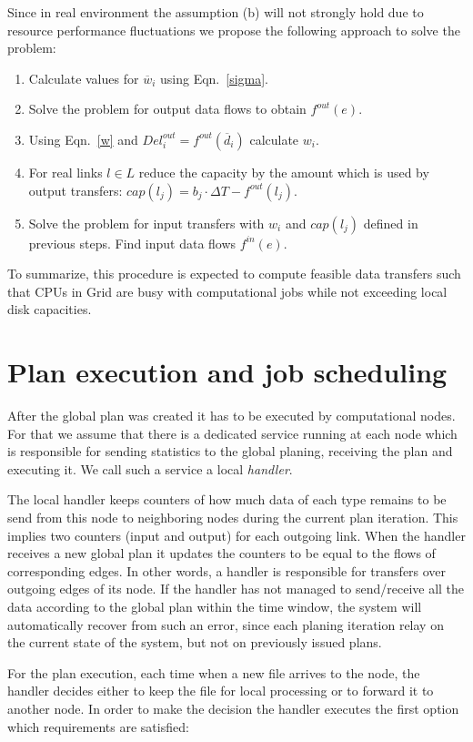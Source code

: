 \documentclass{svjour3}                     %
\begin{document}
Since in real environment the assumption (b) will not strongly hold due to
resource performance fluctuations we propose the following approach to
solve the problem:
%
\begin{enumerate}
\item Calculate values for $\overline{w}_{i}$ using Eqn.~\ref{sigma}.
\item Solve the problem for output data flows to obtain $f^{out}(e)$.
\item Using Eqn.~\ref{w} and $Del_{i}^{out} = f^{out}(\overline{d}_{i})$ calculate $w_{i}$.
\item For real links $l \in L$ reduce the capacity by the amount which is used by output transfers: $cap(l_{j}) = b_{j} \cdot \Delta T - f^{out}(l_{j})$.
\item Solve the problem for input transfers with $w_{i}$ and $cap(l_{j})$ defined in previous steps. Find input data flows $f^{in}(e)$.
\end{enumerate}
%
To summarize, this procedure is expected to compute feasible data transfers 
such that CPUs in Grid are busy with computational jobs while not exceeding 
local disk capacities.

\section{Plan execution and job scheduling}
\label{plan-execution}
After the global plan was created it has to be executed by computational
nodes. For that we assume that there is a dedicated service running at each node
which is responsible for sending statistics to the global planing, receiving the plan and executing it. We call such a service a local \textit{handler}.

The local handler keeps counters of how much data of each type remains to be send from this node to neighboring nodes during the current plan iteration. This implies two counters (input and output) for each outgoing link. When the handler receives a new global plan it updates the counters to be equal to the flows of corresponding edges. In other words, a handler is responsible for transfers over outgoing edges of its node. If the handler has not managed to send/receive all the data according to the global plan within the time window, the system will automatically recover from such an error, since each planing iteration relay on the current state of the system, but not on previously issued plans.  

For the plan execution, each time when a new file arrives to the node, the handler decides either to keep the file for local processing or to forward it to another node. In order to make the decision the handler executes the first option which requirements are satisfied:
\end{document}
